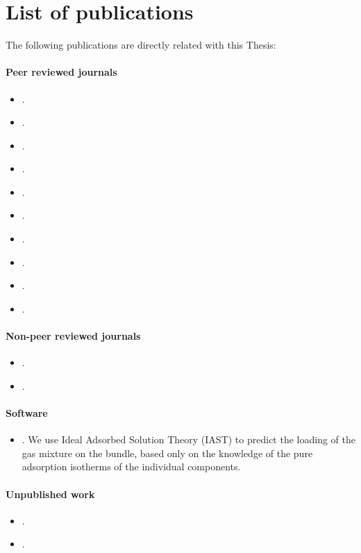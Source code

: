 {}
\setcounter{footnote}{0}
\chapter*{\textbf{List of publications}}
The following publications are directly related with this Thesis:
\subsubsection{Peer reviewed journals}
\begin{itemize}
\item {}. %
\item {}.
\item {}.
\item {}.
\item {}.
\item {}.
\item {}.
\item {}.
\item {}.
\item {}.
\end{itemize}

\subsubsection{Non-peer reviewed journals}
\begin{itemize}
\item {}.
\item {}.
\end{itemize}
\subsubsection{Software}
\begin{itemize}
\item {}. We use Ideal Adsorbed Solution Theory (IAST) to predict the loading of the gas mixture on the bundle, based only on the knowledge of the pure adsorption isotherms of the individual components.
\end{itemize}
\subsubsection{Unpublished work}
\begin{itemize}
\item {}.
\item {}.
\end{itemize}
